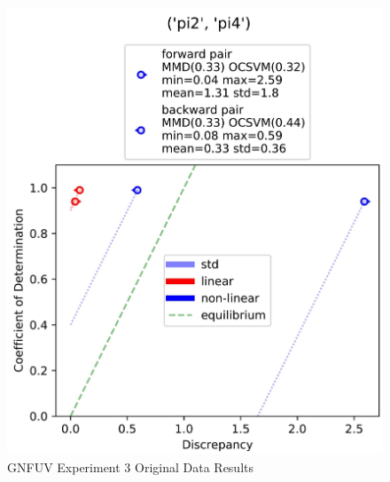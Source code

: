 \documentclass{mpaper}
\begin{document}
\begin{figure}
    \begin{center}
        \includegraphics[scale = 0.09]{experiment_3.jpg}
    \end{center}
    \caption{GNFUV Experiment 3 Original Data Results}
    \label{fig:gnfuv_exp3}
\end{figure}
\end{document}
